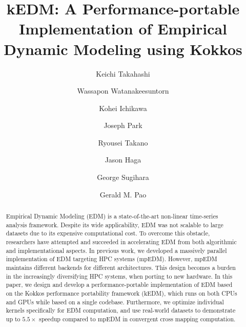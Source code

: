 \documentclass{acmart}
\begin{document}


\title{kEDM: A Performance-portable Implementation of Empirical Dynamic
Modeling using Kokkos}

\author{Keichi Takahashi}
\author{Wassapon Watanakeesuntorn}
\author{Kohei Ichikawa}

\author{Joseph Park}

\author{Ryousei Takano}
\author{Jason Haga}

\author{George Sugihara}

\author{Gerald M. Pao}

\renewcommand{\shortauthors}{K. Takahashi et al.}

\begin{abstract}
    Empirical Dynamic Modeling (EDM) is a state-of-the-art non-linear time-series analysis framework. Despite its wide applicability, EDM was not
    scalable to large datasets due to its expensive computational cost. To
    overcome this obstacle, researchers have attempted and succeeded in accelerating EDM from
    both algorithmic and implementational aspects. In previous work, we
     developed a massively parallel implementation of EDM targeting
    HPC systems (mpEDM). However, mpEDM maintains different backends for different
    architectures. This design becomes a burden in the
    increasingly diversifying HPC systems, when porting to new hardware. In this paper, we design
    and develop a performance-portable implementation of EDM based on
    the Kokkos performance portability framework (kEDM), which runs on both CPUs and
    GPUs while based on a single codebase. Furthermore, we optimize individual kernels specifically for EDM computation, and use real-world datasets to demonstrate up to $5.5\times$ speedup compared to mpEDM
    in convergent cross mapping computation.
\end{abstract}
\end{document}

